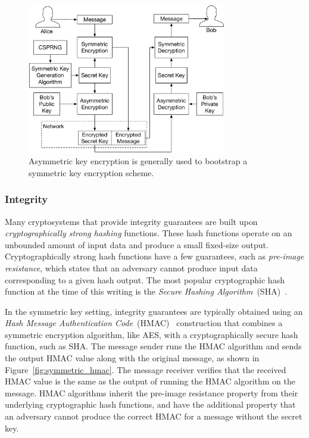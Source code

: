 \begin{figure}[hbt]
  \centering
  \includegraphics[width=87mm]{figures/asymmetric_encryption.pdf}
  \caption{
    Asymmetric key encryption is generally used to bootstrap a symmetric
    key encryption scheme.
  }
  \label{fig:asymmetric_encryption}
\end{figure}


\subsubsection{Integrity}

Many cryptosystems that provide integrity guarantees are built upon
\textit{cryptographically strong hashing} functions. These hash functions
operate on an unbounded amount of input data and produce a small fixed-size
output. Cryptographically strong hash functions have a few guarantees, such as
\textit{pre-image resistance}, which states that an adversary cannot produce
input data corresponding to a given hash output. The most popular cryptographic
hash function at the time of this writing is the
\textit{Secure Hashing Algorithm}~(SHA)~\cite{eastlake2001sha1}.

In the symmetric key setting, integrity guarantees are typically obtained using
an \textit{Hash Message Authentication Code}~(HMAC)~\cite{krawczyk1997hmac}
construction that combines a symmetric encryption algorithm, like AES, with a
cryptographically secure hash function, such as SHA. The message sender runs
the HMAC algorithm and sends the output HMAC value along with the original
message, as shown in Figure~\ref{fig:symmetric_hmac}. The message receiver
verifies that the received HMAC value is the same as the output of running the
HMAC algorithm on the message. HMAC algorithms inherit the pre-image resistance
property from their underlying cryptographic hash functions, and have the
additional property that an adversary cannot produce the correct HMAC for a
message without the secret key.

